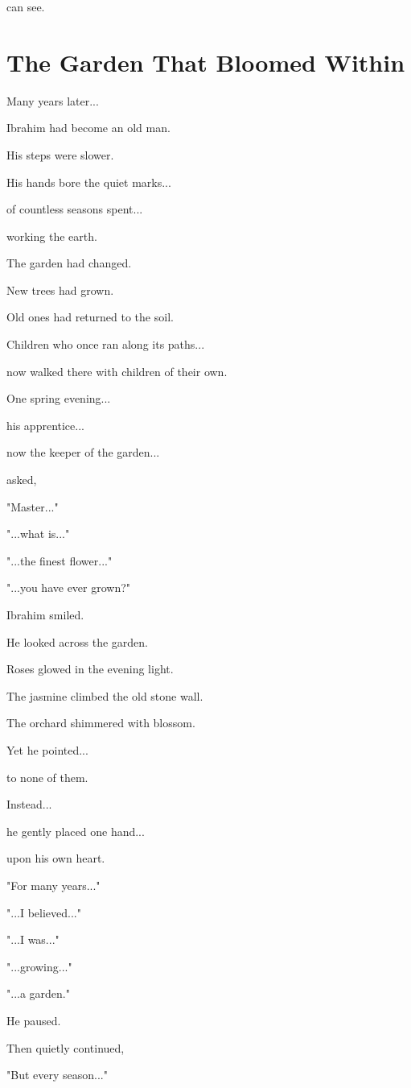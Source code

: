 \documentclass[12pt,openany]{book}
\begin{document}
can see.
\section*{The Garden That Bloomed Within}

Many years later...

Ibrahim had become an old man.

His steps were slower.

His hands bore the quiet marks...

of countless seasons spent...

working the earth.

The garden had changed.

New trees had grown.

Old ones had returned to the soil.

Children who once ran along its paths...

now walked there with children of their own.

One spring evening...

his apprentice...

now the keeper of the garden...

asked,

"Master..."

"...what is..."

"...the finest flower..."

"...you have ever grown?"

Ibrahim smiled.

He looked across the garden.

Roses glowed in the evening light.

The jasmine climbed the old stone wall.

The orchard shimmered with blossom.

Yet he pointed...

to none of them.

Instead...

he gently placed one hand...

upon his own heart.

"For many years..."

"...I believed..."

"...I was..."

"...growing..."

"...a garden."

He paused.

Then quietly continued,

"But every season..."
\end{document}
